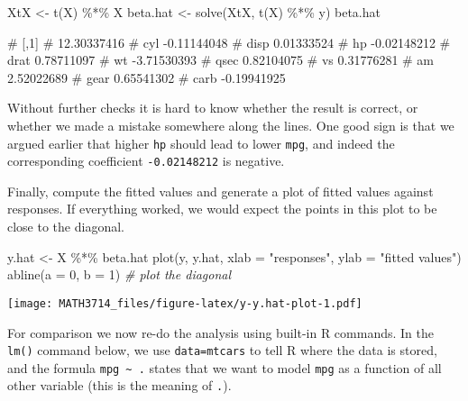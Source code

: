 \documentclass[
  a4paper,
]{article}
\newenvironment{Shaded}{\begin{snugshade}}{\end{snugshade}}
\newcommand{\AttributeTok}[1]{\textcolor[rgb]{0.77,0.63,0.00}{#1}}
\newcommand{\CommentTok}[1]{\textcolor[rgb]{0.56,0.35,0.01}{\textit{#1}}}
\newcommand{\DecValTok}[1]{\textcolor[rgb]{0.00,0.00,0.81}{#1}}
\newcommand{\FunctionTok}[1]{\textcolor[rgb]{0.00,0.00,0.00}{#1}}
\newcommand{\NormalTok}[1]{#1}
\newcommand{\OtherTok}[1]{\textcolor[rgb]{0.56,0.35,0.01}{#1}}
\newcommand{\SpecialCharTok}[1]{\textcolor[rgb]{0.00,0.00,0.00}{#1}}
\newcommand{\StringTok}[1]{\textcolor[rgb]{0.31,0.60,0.02}{#1}}
\theoremstyle{definition}
\theoremstyle{definition}
\theoremstyle{definition}
\theoremstyle{definition}
\theoremstyle{remark}
\begin{document}
\begin{Shaded}
\begin{Highlighting}[]
\NormalTok{XtX }\OtherTok{\textless{}{-}} \FunctionTok{t}\NormalTok{(X) }\SpecialCharTok{\%*\%}\NormalTok{ X}
\NormalTok{beta.hat }\OtherTok{\textless{}{-}} \FunctionTok{solve}\NormalTok{(XtX, }\FunctionTok{t}\NormalTok{(X) }\SpecialCharTok{\%*\%}\NormalTok{ y)}
\NormalTok{beta.hat}
\end{Highlighting}
\end{Shaded}

\begin{Shaded}
\begin{Highlighting}[]
\NormalTok{\#             [,1]}
\NormalTok{\#      12.30337416}
\NormalTok{\# cyl  {-}0.11144048}
\NormalTok{\# disp  0.01333524}
\NormalTok{\# hp   {-}0.02148212}
\NormalTok{\# drat  0.78711097}
\NormalTok{\# wt   {-}3.71530393}
\NormalTok{\# qsec  0.82104075}
\NormalTok{\# vs    0.31776281}
\NormalTok{\# am    2.52022689}
\NormalTok{\# gear  0.65541302}
\NormalTok{\# carb {-}0.19941925}
\end{Highlighting}
\end{Shaded}

Without further checks it is hard to know whether the result is correct, or
whether we made a mistake somewhere along the lines. One good sign is that
we argued earlier that higher \texttt{hp} should lead to lower \texttt{mpg}, and indeed the
corresponding coefficient \texttt{-0.02148212} is negative.

Finally, compute the fitted values and generate a plot of fitted values
against responses. If everything worked, we would expect the points in this
plot to be close to the diagonal.

\begin{Shaded}
\begin{Highlighting}[]
\NormalTok{y.hat }\OtherTok{\textless{}{-}}\NormalTok{ X }\SpecialCharTok{\%*\%}\NormalTok{ beta.hat}
\FunctionTok{plot}\NormalTok{(y, y.hat, }\AttributeTok{xlab =} \StringTok{"responses"}\NormalTok{, }\AttributeTok{ylab =} \StringTok{"fitted values"}\NormalTok{)}
\FunctionTok{abline}\NormalTok{(}\AttributeTok{a =} \DecValTok{0}\NormalTok{, }\AttributeTok{b =} \DecValTok{1}\NormalTok{) }\CommentTok{\# plot the diagonal}
\end{Highlighting}
\end{Shaded}

\texttt{[image: MATH3714\_files/figure-latex/y-y.hat-plot-1.pdf]}

For comparison we now re-do the analysis using built-in R commands.
In the \texttt{lm()} command below, we use \texttt{data=mtcars} to tell R where the
data is stored, and the formula \texttt{mpg\ \textasciitilde{}\ .} states that we want to
model \texttt{mpg} as a function of all other variable (this is the meaning of \texttt{.}).
\end{document}
